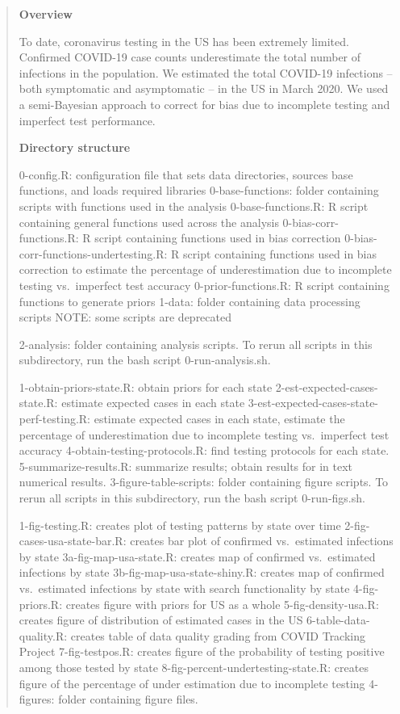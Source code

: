 \documentclass[]{book}
\begin{document}
\begin{quote}
\textbf{Overview}

To date, coronavirus testing in the US has been extremely limited.
Confirmed COVID-19 case counts underestimate the total number of
infections in the population. We estimated the total COVID-19 infections
-- both symptomatic and asymptomatic -- in the US in March 2020. We used
a semi-Bayesian approach to correct for bias due to incomplete testing
and imperfect test performance.

\textbf{Directory structure}

0-config.R: configuration file that sets data directories, sources base
functions, and loads required libraries 0-base-functions: folder
containing scripts with functions used in the analysis
0-base-functions.R: R script containing general functions used across
the analysis 0-bias-corr-functions.R: R script containing functions used
in bias correction 0-bias-corr-functions-undertesting.R: R script
containing functions used in bias correction to estimate the percentage
of underestimation due to incomplete testing vs.~imperfect test accuracy
0-prior-functions.R: R script containing functions to generate priors
1-data: folder containing data processing scripts NOTE: some scripts are
deprecated

2-analysis: folder containing analysis scripts. To rerun all scripts in
this subdirectory, run the bash script 0-run-analysis.sh.

1-obtain-priors-state.R: obtain priors for each state
2-est-expected-cases-state.R: estimate expected cases in each state
3-est-expected-cases-state-perf-testing.R: estimate expected cases in
each state, estimate the percentage of underestimation due to incomplete
testing vs.~imperfect test accuracy 4-obtain-testing-protocols.R: find
testing protocols for each state. 5-summarize-results.R: summarize
results; obtain results for in text numerical results.
3-figure-table-scripts: folder containing figure scripts. To rerun all
scripts in this subdirectory, run the bash script 0-run-figs.sh.

1-fig-testing.R: creates plot of testing patterns by state over time
2-fig-cases-usa-state-bar.R: creates bar plot of confirmed vs.~estimated
infections by state 3a-fig-map-usa-state.R: creates map of confirmed
vs.~estimated infections by state 3b-fig-map-usa-state-shiny.R: creates
map of confirmed vs.~estimated infections by state with search
functionality by state 4-fig-priors.R: creates figure with priors for US
as a whole 5-fig-density-usa.R: creates figure of distribution of
estimated cases in the US 6-table-data-quality.R: creates table of data
quality grading from COVID Tracking Project 7-fig-testpos.R: creates
figure of the probability of testing positive among those tested by
state 8-fig-percent-undertesting-state.R: creates figure of the
percentage of under estimation due to incomplete testing 4-figures:
folder containing figure files.


\end{quote}
\end{document}
